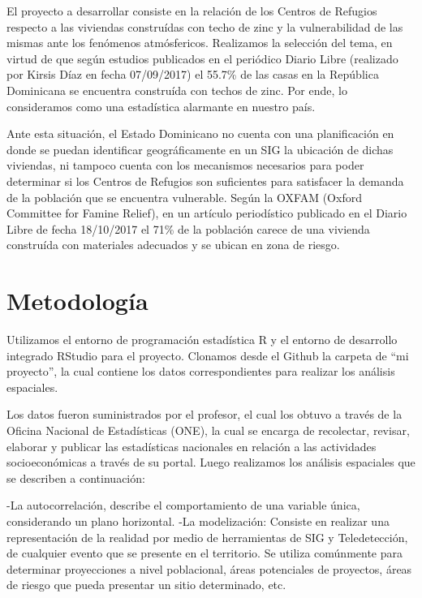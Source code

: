 \documentclass[11pt,]{article}
\begin{document}
El proyecto a desarrollar consiste en la relación de los Centros de
Refugios respecto a las viviendas construídas con techo de zinc y la
vulnerabilidad de las mismas ante los fenómenos atmósfericos. Realizamos
la selección del tema, en virtud de que según estudios publicados en el
periódico Diario Libre (realizado por Kirsis Díaz en fecha 07/09/2017)
el 55.7\% de las casas en la República Dominicana se encuentra
construída con techos de zinc. Por ende, lo consideramos como una
estadística alarmante en nuestro país.

Ante esta situación, el Estado Dominicano no cuenta con una
planificación en donde se puedan identificar geográficamente en un SIG
la ubicación de dichas viviendas, ni tampoco cuenta con los mecanismos
necesarios para poder determinar si los Centros de Refugios son
suficientes para satisfacer la demanda de la población que se encuentra
vulnerable. Según la OXFAM (Oxford Committee for Famine Relief), en un
artículo periodístico publicado en el Diario Libre de fecha 18/10/2017
el 71\% de la población carece de una vivienda construída con materiales
adecuados y se ubican en zona de riesgo.

\section{Metodología}\label{metodologuxeda}

Utilizamos el entorno de programación estadística R y el entorno de
desarrollo integrado RStudio para el proyecto. Clonamos desde el Github
la carpeta de ``mi proyecto'', la cual contiene los datos
correspondientes para realizar los análisis espaciales.

Los datos fueron suministrados por el profesor, el cual los obtuvo a
través de la Oficina Nacional de Estadísticas (ONE), la cual se encarga
de recolectar, revisar, elaborar y publicar las estadísticas nacionales
en relación a las actividades socioeconómicas a través de su portal.
Luego realizamos los análisis espaciales que se describen a
continuación:

-La autocorrelación, describe el comportamiento de una variable única,
considerando un plano horizontal. -La modelización: Consiste en realizar
una representación de la realidad por medio de herramientas de SIG y
Teledetección, de cualquier evento que se presente en el territorio. Se
utiliza comúnmente para determinar proyecciones a nivel poblacional,
áreas potenciales de proyectos, áreas de riesgo que pueda presentar un
sitio determinado, etc.
\end{document}
